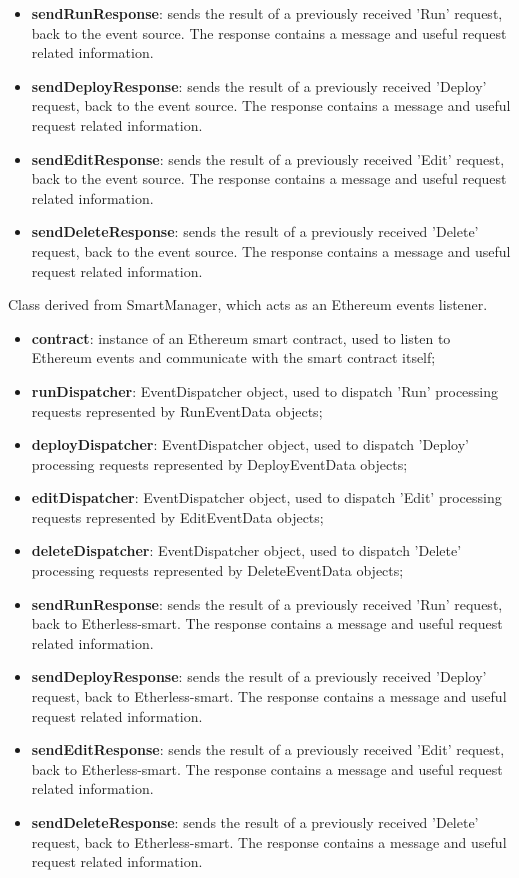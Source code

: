 	\begin{itemize}
		\item \textbf{sendRunResponse}: sends the result of a previously received 'Run' request, back to the event source. The response contains a message and useful request related information.
		\item \textbf{sendDeployResponse}: sends the result of a previously received 'Deploy' request, back to the event source. The response contains a message and useful request related information.
		\item \textbf{sendEditResponse}: sends the result of a previously received 'Edit' request, back to the event source. The response contains a message and useful request related information.
		\item \textbf{sendDeleteResponse}: sends the result of a previously received 'Delete' request, back to the event source. The response contains a message and useful request related information.
	\end{itemize}
	Class derived from SmartManager, which acts as an Ethereum events listener.
	\begin{itemize}
		\item \textbf{contract}: instance of an Ethereum smart contract, used to listen to Ethereum events and communicate with the smart contract itself;
		\item \textbf{runDispatcher}: EventDispatcher object, used to dispatch 'Run' processing requests represented by RunEventData objects;
		\item \textbf{deployDispatcher}: EventDispatcher object, used to dispatch 'Deploy' processing requests represented by DeployEventData objects;
		\item \textbf{editDispatcher}: EventDispatcher object, used to dispatch 'Edit' processing requests represented by EditEventData objects;
		\item \textbf{deleteDispatcher}: EventDispatcher object, used to dispatch 'Delete' processing requests represented by DeleteEventData objects;
	\end{itemize}
	\begin{itemize}
		\item \textbf{sendRunResponse}: sends the result of a previously received 'Run' request, back to Etherless-smart. The response contains a message and useful request related information.
		\item \textbf{sendDeployResponse}: sends the result of a previously received 'Deploy' request, back to Etherless-smart. The response contains a message and useful request related information.
		\item \textbf{sendEditResponse}: sends the result of a previously received 'Edit' request, back to Etherless-smart. The response contains a message and useful request related information.
		\item \textbf{sendDeleteResponse}: sends the result of a previously received 'Delete' request, back to Etherless-smart. The response contains a message and useful request related information.
	\end{itemize}

